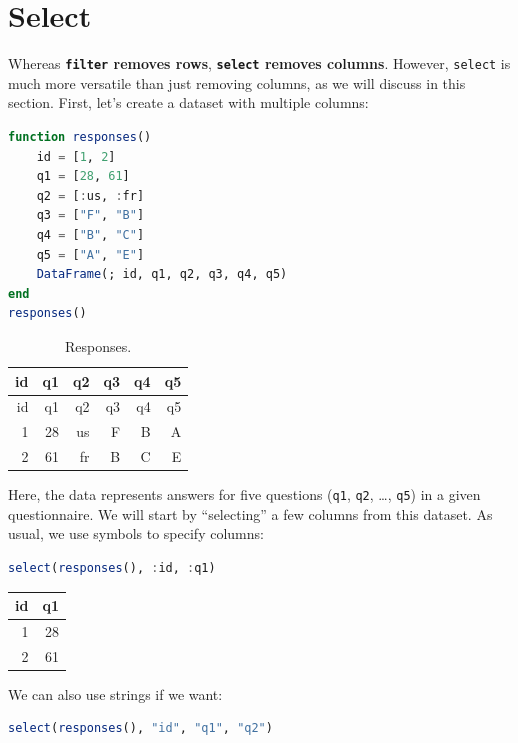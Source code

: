 \documentclass[
  notoc %
]{tufte-book}
\newcommand{\passthrough}[1]{#1}
\begin{document}
\hypertarget{sec:select}{%
\section{Select}\label{sec:select}}

Whereas \textbf{\passthrough{\lstinline!filter!} removes rows},
\textbf{\passthrough{\lstinline!select!} removes columns}. However,
\passthrough{\lstinline!select!} is much more versatile than just
removing columns, as we will discuss in this section. First, let's
create a dataset with multiple columns:

\begin{lstlisting}[language=Julia]
function responses()
    id = [1, 2]
    q1 = [28, 61]
    q2 = [:us, :fr]
    q3 = ["F", "B"]
    q4 = ["B", "C"]
    q5 = ["A", "E"]
    DataFrame(; id, q1, q2, q3, q4, q5)
end
responses()
\end{lstlisting}

\hypertarget{tbl:responses}{}
\begin{longtable}[]{@{}rrrrrr@{}}
\caption{\label{tbl:responses}Responses.}\tabularnewline
\toprule
id & q1 & q2 & q3 & q4 & q5 \\
\midrule
\endfirsthead
\toprule
id & q1 & q2 & q3 & q4 & q5 \\
\midrule
\endhead
1 & 28 & us & F & B & A \\
2 & 61 & fr & B & C & E \\
\bottomrule
\end{longtable}

Here, the data represents answers for five questions
(\passthrough{\lstinline!q1!}, \passthrough{\lstinline!q2!}, \ldots,
\passthrough{\lstinline!q5!}) in a given questionnaire. We will start by
``selecting'' a few columns from this dataset. As usual, we use symbols
to specify columns:

\begin{lstlisting}[language=Julia]
select(responses(), :id, :q1)
\end{lstlisting}

\begin{longtable}[]{@{}rr@{}}
\toprule
id & q1 \\
\midrule
\endhead
1 & 28 \\
2 & 61 \\
\bottomrule
\end{longtable}

We can also use strings if we want:

\begin{lstlisting}[language=Julia]
select(responses(), "id", "q1", "q2")
\end{lstlisting}
\end{document}
